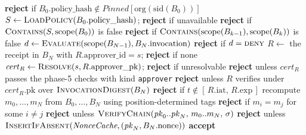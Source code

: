 \documentclass[11pt,a4paper]{article}
\begin{document}
\begin{algorithm}[!t]
\caption{DelegationChain verification, phases 6--8: policy, approvals,
and the chain signatures. Continues \cref{alg:verify}; line numbering and
the enclosing procedure carry over.}
\label{alg:verify2}
\begin{algorithmic}[1]
  \State \textbf{reject} if $B_0.\text{policy\_hash} \notin
         \mathit{Pinned}[\mathrm{org}(\mathrm{sid}(B_0))]$
  \State $S \gets \Call{LoadPolicy}{B_0.\text{policy\_hash}}$;
         \textbf{reject} if unavailable
  \State \textbf{reject} if $\Call{Contains}{S, \mathrm{scope}(B_0)}$
         is false
    \State \textbf{reject} if $\Call{Contains}{\mathrm{scope}(B_{k-1}),
           \mathrm{scope}(B_k)}$ is false
  \EndFor
  \State $d \gets \Call{Evaluate}{\mathrm{scope}(B_{N-1}),
         B_N.\text{invocation}}$
  \State \textbf{reject} if $d = \textsc{deny}$
      \State $R \gets$ the receipt in $B_N$ with
             $R.\text{approver\_id} = s$; \textbf{reject} if none
      \State $\mathit{cert}_R \gets
             \Call{Resolve}{s, R.\text{approver\_pk}}$; \textbf{reject}
             if unresolvable
      \State \textbf{reject} unless $\mathit{cert}_R$ passes the phase-5
             checks with kind \texttt{approver}
      \State \textbf{reject} unless $R$ verifies under
             $\mathit{cert}_R.\text{pk}$ over
             $\Call{InvocationDigest}{B_N}$
      \State \textbf{reject} if $t \notin [\,R.\text{iat},\,
             R.\text{exp}\,]$
    \EndFor
  \EndIf
  \State recompute $m_0, \ldots, m_N$ from $B_0, \ldots, B_N$ using
         position-determined tags
  \State \textbf{reject} if $m_i = m_j$ for some $i \neq j$
  \State \textbf{reject} unless
         $\Call{VerifyChain}{\pk_0..\pk_N,\, m_0..m_N,\, \sigma}$
  \State \textbf{reject} unless
         $\Call{InsertIfAbsent}{\textit{NonceCache},
         (\pk_N, B_N.\text{nonce})}$
  \State \textbf{accept}
\EndProcedure
\end{algorithmic}
\end{algorithm}
\end{document}
